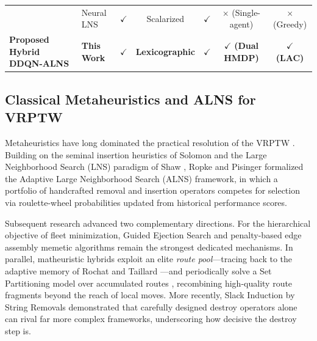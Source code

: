 \begin{table}[!t]
\begin{tabularx}{\textwidth}{
    l
    X
    c
    c
    c
    c
    c
}
&
Neural LNS \cite{hottung2020neural}
&
$\checkmark$
&
Scalarized
&
$\checkmark$
&
$\times$ (Single-agent)
&
$\times$ (Greedy)
\\

\addlinespace[3pt]

\midrule

\textbf{Proposed Hybrid DDQN-ALNS}
&
\textbf{This Work}
&
$\mathbf{\checkmark}$
&
\textbf{Lexicographic}
&
$\mathbf{\checkmark}$
&
$\mathbf{\checkmark}$ \textbf{(Dual HMDP)}
&
$\mathbf{\checkmark}$ \textbf{(LAC)}
\\

\bottomrule
\end{tabularx}
\end{table}

\subsection{Classical Metaheuristics and ALNS for VRPTW}
\label{sec:rw_classical}

Metaheuristics have long dominated the practical resolution of the VRPTW
\cite{braysy2005vehicle}. Building on the seminal insertion heuristics of
Solomon \cite{Solomon1987} and the Large Neighborhood Search (LNS)
paradigm of Shaw \cite{shaw1998using}, Ropke and Pisinger
\cite{Ropke2006, pisinger2007general, pisinger2010large} formalized the
Adaptive Large Neighborhood Search (ALNS) framework, in which a portfolio of
handcrafted removal and insertion operators competes for selection via
roulette-wheel probabilities updated from historical performance scores.

Subsequent research advanced two complementary directions. For the
hierarchical objective of fleet minimization, Guided Ejection Search
\cite{nagata2009ges} and penalty-based edge assembly memetic algorithms
\cite{nagata2010srex} remain the strongest dedicated mechanisms. In parallel,
matheuristic hybrids exploit an elite \emph{route pool}---tracing back to the
adaptive memory of Rochat and Taillard \cite{rochat1995probabilistic}---and
periodically solve a Set Partitioning model over accumulated routes
\cite{alvarenga2007genetic, subramanian2013hybrid, vidal2013hybrid},
recombining high-quality route fragments beyond the reach of local moves.
More recently, Slack Induction by String Removals \cite{christiaens2020slack}
demonstrated that carefully designed destroy operators alone can rival far
more complex frameworks, underscoring how decisive the destroy step is.

